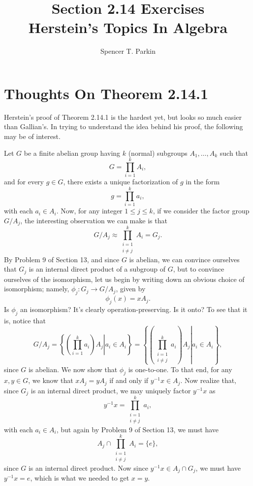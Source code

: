 \documentclass[12pt]{article}
\title{Section 2.14 Exercises\\Herstein's Topics In Algebra}
\author{Spencer T. Parkin}
\begin{document}
\maketitle

\section*{Thoughts On Theorem 2.14.1}

Herstein's proof of Theorem 2.14.1 is the hardest yet, but looks so much easier than Gallian's.
In trying to understand the idea behind his proof, the following may be of interest.

Let $G$ be a finite abelian group having $k$ (normal) subgroups $A_1,\dots,A_k$ such that
\begin{equation*}
G=\prod_{i=1}^k A_i,
\end{equation*}
and for every $g\in G$, there exists a unique factorization of $g$ in the form
\begin{equation*}
g=\prod_{i=1}^k a_i,
\end{equation*}
with each $a_i\in A_i$.  Now, for any integer $1\leq j\leq k$, if we consider the factor group
$G/A_j$, the interesting observation we can make is that
\begin{equation*}
G/A_j\approx\prod_{\substack{i=1\\i\neq j}}^k A_i=G_j.
\end{equation*}
By Problem 9 of Section 13, and since $G$ is abelian, we can convince ourselves that $G_j$ is an internal direct product of a subgroup of $G$,
but to convince ourselves of the isomorphism, let us begin by writing down an obvious choice of isomorphism; namely,
$\phi_j:G_j\to G/A_j$, given by
\begin{equation*}
\phi_j(x)=xA_j.
\end{equation*}
Is $\phi_j$ an isomorphism?  It's clearly operation-preserving.  Is it onto?  To see that it is, notice that
\begin{equation*}
G/A_j=\left\{\left.\left(\prod_{i=1}^k a_i\right)A_j\right|a_i\in A_i\right\}=\left\{\left.\left(\prod_{\substack{i=1\\i\neq j}}^k a_i\right)A_j\right|a_i\in A_i\right\},
\end{equation*}
since $G$ is abelian.  We now show that $\phi_j$ is one-to-one.  To that end, for any $x,y\in G$, we know that $xA_j=yA_j$ if and only if
$y^{-1}x\in A_j$.  Now realize that, since $G_j$ is an internal direct product, we may uniquely factor $y^{-1}x$ as
\begin{equation*}
y^{-1}x = \prod_{\substack{i=1\\i\neq j}}^k a_i,
\end{equation*}
with each $a_i\in A_i$, but again by Problem 9 of Section 13, we must have
\begin{equation*}
A_j\cap\prod_{\substack{i=1\\i\neq j}}^k A_i=\{e\},
\end{equation*}
since $G$ is an internal direct product.  Now since $y^{-1}x\in A_j\cap G_j$,
we must have $y^{-1}x=e$, which is what we needed to get $x=y$.
\end{document}
